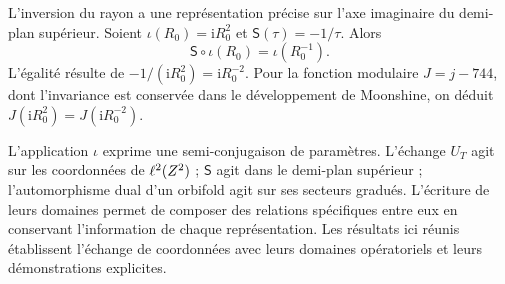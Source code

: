 L’inversion du rayon a une représentation précise sur
l’axe imaginaire du demi-plan supérieur. Soient
\(\iota(R_0)=\mathrm iR_0^2\) et
\(\mathsf S(\tau)=-1/\tau\). Alors
\begin{equation}
 \mathsf S\circ\iota(R_0)=\iota(R_0^{-1}).
 \label{x_reciprocidad:iv:eq:semiconjugacion-modular}
\end{equation}
L’égalité résulte de
\(-1/(\mathrm iR_0^2)=\mathrm iR_0^{-2}\). Pour la fonction
modulaire \(J=j-744\), dont l’invariance est conservée dans le
développement de Moonshine, on déduit
\(J(\mathrm iR_0^2)=J(\mathrm iR_0^{-2})\).

L’application \(\iota\) exprime une semi-conjugaison de paramètres.
L’échange \(U_T\) agit sur les coordonnées de
\(\ell^2(Z^2)\) ; \(\mathsf S\) agit dans le demi-plan
supérieur ; l’automorphisme dual d’un orbifold agit sur ses
secteurs gradués. L’écriture de leurs domaines permet de
composer des relations spécifiques entre eux en conservant
l’information de chaque représentation. Les résultats ici
réunis établissent l’échange de coordonnées avec leurs
domaines opératoriels et leurs démonstrations explicites.
